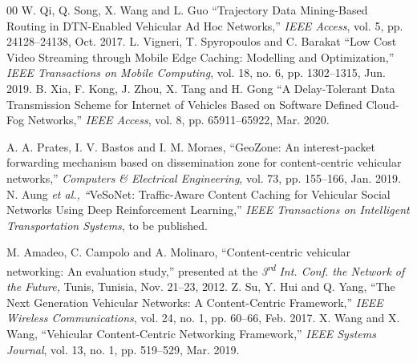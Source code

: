 \documentclass{ieeeaccess}
\begin{document}
\begin{thebibliography}{00}
 W. Qi, Q. Song, X. Wang and L. Guo ``Trajectory Data Mining-Based Routing in DTN-Enabled Vehicular Ad Hoc Networks,'' \emph{IEEE Access}, vol. 5, pp. 24128--24138, Oct. 2017.
 L. Vigneri, T. Spyropoulos and C. Barakat ``Low Cost Video Streaming through Mobile Edge Caching: Modelling and Optimization,'' \emph{IEEE Transactions on Mobile Computing}, vol. 18, no. 6, pp. 1302--1315, Jun. 2019.
 B. Xia, F. Kong, J. Zhou, X. Tang and H. Gong ``A Delay-Tolerant Data Transmission Scheme for Internet of Vehicles Based on Software Defined Cloud-Fog Networks,'' \emph{IEEE Access}, vol. 8, pp. 65911--65922, Mar. 2020.

 A. A. Prates, I. V. Bastos and I. M. Moraes, ``GeoZone: An interest-packet forwarding mechanism based on dissemination zone for content-centric vehicular networks,'' \emph{Computers \& Electrical Engineering}, vol. 73, pp. 155--166, Jan. 2019.
 N. Aung \emph{et al., ``}VeSoNet: Traffic-Aware Content Caching for Vehicular Social Networks Using Deep Reinforcement Learning,'' \emph{IEEE Transactions on Intelligent Transportation Systems}, to be published.


 M. Amadeo, C. Campolo and A. Molinaro, ``Content-centric vehicular networking: An evaluation study,'' presented at the \emph{3\textsuperscript{rd} Int. Conf. the Network of the Future,} Tunis, Tunisia, Nov. 21--23, 2012.
 Z. Su, Y. Hui and Q. Yang,  ``The Next Generation Vehicular Networks: A Content-Centric Framework,'' \emph{IEEE Wireless Communications}, vol. 24, no. 1, pp. 60--66, Feb. 2017.
 X. Wang and X. Wang, ``Vehicular Content-Centric Networking Framework,'' \emph{IEEE Systems Journal}, vol. 13, no. 1, pp. 519--529, Mar. 2019.


\end{thebibliography}
\end{document}
